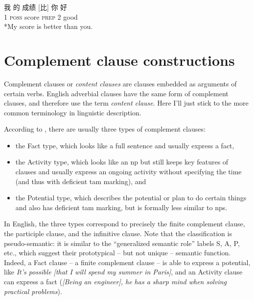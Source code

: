 \documentclass[UTF8, a4paper, oneside, scheme=plain, 12pt]{ctexbook}
\newcommand*{\citesec}[1]{\S~{#1}}
\newcommand*{\term}[1]{\emph{#1}}
\newcommand{\form}[1]{\emph{#1}}
\newcommand{\category}[1]{\textsc{#1}}
\begin{document}
\begin{exe}
    \ex\label{ex:modify.comparative.mandarin-1} \gll 我 的 成绩 [比] 你 好 \\
    1 \category{poss} score \category{prep} 2 good \\
    \ex\label{ex:modify.comparative.mandarin-induced-1} *My score is better than you.
\end{exe}


\chapter{Complement clause constructions}\label{chap:clause-combining.complement-clause}

Complement clauses or \term{content clauses} \citep{cgel} are clauses embedded as arguments of certain verbs.
English adverbial clauses have the same form of complement clauses,
and therefore \citet{cgel} use the term \term{content clause}.
Here I'll just stick to the more common terminology in linguistic description.

According to \citet[\citesec{18.4}]{dixon2010basic2},
there are usually three types of complement clauses:
\begin{itemize}
    \item the Fact type, which looks like a full sentence
    and usually express a fact, 
    \item the Activity type, which looks like an \acs{np}
    but still keeps key features of clauses 
    and usually express an ongoing activity 
    without specifying the time (and thus with deficient \acs{tam} marking), and 
    \item the Potential type,
    which describes the potential or plan to do certain things 
    and also has deficient \acs{tam} marking,
    but is formally less similar to \acs{np}s.
\end{itemize}
In English, the three types correspond to precisely 
the finite complement clause,
the participle clause,
and the infinitive clause.
Note that the classification is pseudo-semantic:
it is similar to the ``generalized semantic role'' labels S, A, P, etc.,
which suggest their prototypical -- but not unique -- semantic function.
Indeed, a Fact clause -- a finite complement clause -- 
is able to express a potential,
like \form{It's possible [that I will spend my summer in Paris]},
and an Activity clause can express a fact 
(\form{[Being an engineer], he has a sharp mind when solving practical problems}).
\end{document}

